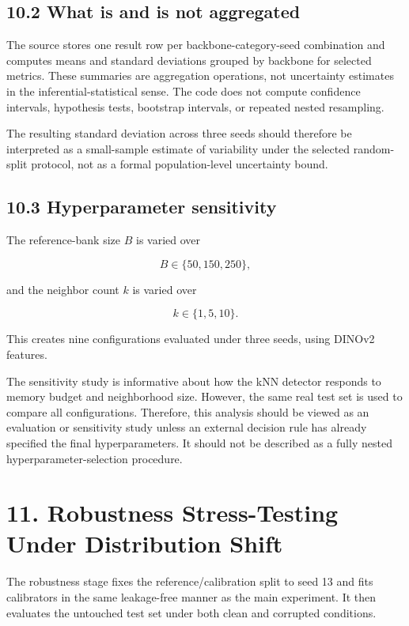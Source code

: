 \documentclass[
  11pt,
]{article}
\begin{document}
\subsection{10.2 What is and is not
aggregated}\label{what-is-and-is-not-aggregated}

The source stores one result row per backbone-category-seed combination
and computes means and standard deviations grouped by backbone for
selected metrics. These summaries are aggregation operations, not
uncertainty estimates in the inferential-statistical sense. The code
does not compute confidence intervals, hypothesis tests, bootstrap
intervals, or repeated nested resampling.

The resulting standard deviation across three seeds should therefore be
interpreted as a small-sample estimate of variability under the selected
random-split protocol, not as a formal population-level uncertainty
bound.

\subsection{10.3 Hyperparameter
sensitivity}\label{hyperparameter-sensitivity}

The reference-bank size \(B\) is varied over

\[
B\in\{50,150,250\},
\]

and the neighbor count \(k\) is varied over

\[
k\in\{1,5,10\}.
\]

This creates nine configurations evaluated under three seeds, using
DINOv2 features.

The sensitivity study is informative about how the kNN detector responds
to memory budget and neighborhood size. However, the same real test set
is used to compare all configurations. Therefore, this analysis should
be viewed as an evaluation or sensitivity study unless an external
decision rule has already specified the final hyperparameters. It should
not be described as a fully nested hyperparameter-selection procedure.

\section{11. Robustness Stress-Testing Under Distribution
Shift}\label{robustness-stress-testing-under-distribution-shift}

The robustness stage fixes the reference/calibration split to seed 13
and fits calibrators in the same leakage-free manner as the main
experiment. It then evaluates the untouched test set under both clean
and corrupted conditions.
\end{document}
